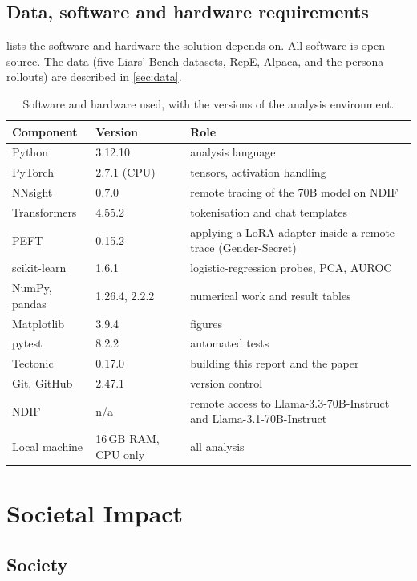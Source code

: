 \subsection{Data, software and hardware requirements}

 lists the software and hardware the solution depends on. All software is
open source. The data (five Liars' Bench datasets, RepE, Alpaca, and the persona rollouts) are
described in \cref{sec:data}.

\begin{table}[t]
\centering
\small
\caption{Software and hardware used, with the versions of the analysis environment.}
\label{tab:software}
\begin{tabularx}{\linewidth}{@{}l l X@{}}
\toprule
Component & Version & Role \\
\midrule
Python & 3.12.10 & analysis language \\
PyTorch & 2.7.1 (CPU) & tensors, activation handling \\
NNsight & 0.7.0 & remote tracing of the 70B model on NDIF \\
Transformers & 4.55.2 & tokenisation and chat templates \\
PEFT & 0.15.2 & applying a LoRA adapter inside a remote trace (Gender-Secret) \\
scikit-learn & 1.6.1 & logistic-regression probes, PCA, AUROC \\
NumPy, pandas & 1.26.4, 2.2.2 & numerical work and result tables \\
Matplotlib & 3.9.4 & figures \\
pytest & 8.2.2 & automated tests \\
Tectonic & 0.17.0 & building this report and the paper \\
Git, GitHub & 2.47.1 & version control \\
\midrule
NDIF & n/a & remote access to Llama-3.3-70B-Instruct and Llama-3.1-70B-Instruct \\
Local machine & 16\,GB RAM, CPU only & all analysis \\
\bottomrule
\end{tabularx}
\end{table}

\section{Societal Impact}
\label{sec:societal}

\subsection{Society}

